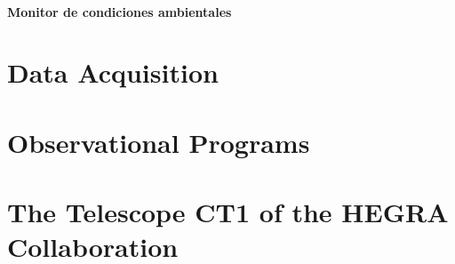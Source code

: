 \paragraph{Monitor de condiciones ambientales}

\section{Data Acquisition}

\section{Observational Programs}

\section{The Telescope CT1 of the HEGRA Collaboration}

\endinput
%

